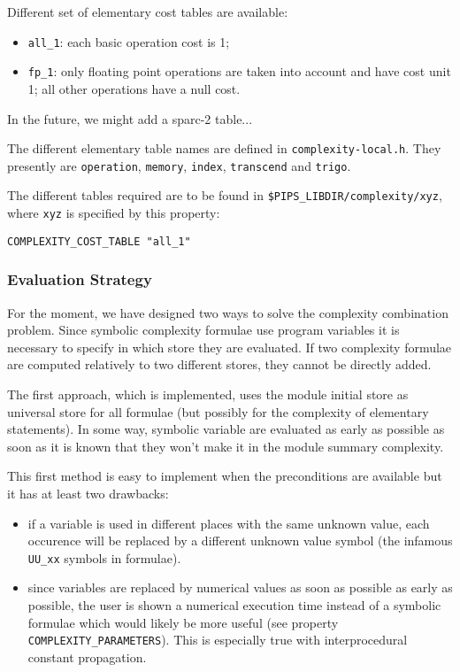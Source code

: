 Different set of elementary cost tables are available:

\begin{itemize}

  \item \verb+all_1+: each basic operation cost is 1;

  \item \verb+fp_1+: only floating point operations are taken into
account and have cost unit 1; all other operations have a null cost.

\end{itemize}

In the future, we might add a sparc-2 table...

The different elementary table names are defined in
\verb+complexity-local.h+. They presently are \verb+operation+, 
\verb+memory+, \verb+index+, \verb+transcend+
and \verb+trigo+.

The different tables required are to be found in
\verb+$PIPS_LIBDIR/complexity/xyz+,
where \verb+xyz+ is specified by this property:

\begin{verbatim}
COMPLEXITY_COST_TABLE "all_1"
\end{verbatim}

\subsubsection{Evaluation Strategy}

For the moment, we have designed two ways to solve the complexity
combination problem. Since symbolic complexity formulae use program
variables it is necessary to specify in which store they are
evaluated. If two complexity formulae are computed relatively to two
different stores, they cannot be directly added.

The first approach, which is implemented, uses the module initial store
as universal store for all formulae (but possibly for the complexity of
elementary statements).  In some way, symbolic variable are evaluated as
early as possible as soon as it is known that they won't make it in the
module summary complexity.

This first method is easy to implement when the preconditions are available
but it has at least two drawbacks:

\begin{itemize}

  \item if a variable is used in different places with the same unknown
value, each occurence will be replaced by a different unknown value
symbol (the infamous \verb+UU_xx+ symbols in formulae).

  \item since variables are replaced by numerical values as soon as
possible as early as possible, the user is shown a numerical execution
time instead of a symbolic formulae which would likely be more useful
(see property \verb+COMPLEXITY_PARAMETERS+). This is especially true
with interprocedural constant propagation.

\end{itemize}


